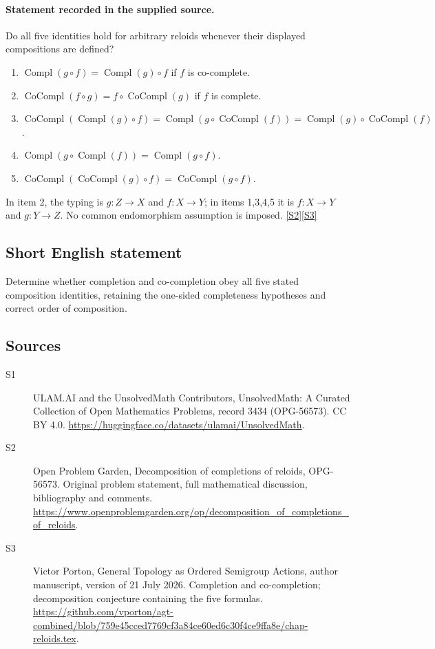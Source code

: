 \documentclass[11pt]{article}
\newcommand{\sref}[2]{\hyperlink{source:#1:#2}{[S#2]}}
\begin{document}
\paragraph{Statement recorded in the supplied source.}
Do all five identities hold for arbitrary reloids whenever their displayed compositions are defined?
\begin{enumerate}
\item $\operatorname{Compl}(g\circ f)=\operatorname{Compl}(g)\circ f$ if $f$ is co-complete.
\item $\operatorname{CoCompl}(f\circ g)=f\circ\operatorname{CoCompl}(g)$ if $f$ is complete.
\item $\operatorname{CoCompl}(\operatorname{Compl}(g)\circ f)=\operatorname{Compl}(g\circ\operatorname{CoCompl}(f))=\operatorname{Compl}(g)\circ\operatorname{CoCompl}(f)$.
\item $\operatorname{Compl}(g\circ\operatorname{Compl}(f))=\operatorname{Compl}(g\circ f)$.
\item $\operatorname{CoCompl}(\operatorname{CoCompl}(g)\circ f)=\operatorname{CoCompl}(g\circ f)$.
\end{enumerate}
In item 2, the typing is $g:Z\to X$ and $f:X\to Y$; in items 1,3,4,5 it is $f:X\to Y$ and $g:Y\to Z$. No common endomorphism assumption is imposed. \sref{3434}{2}\sref{3434}{3}
\subsection{Short English statement}
Determine whether completion and co-completion obey all five stated composition identities, retaining the one-sided completeness hypotheses and correct order of composition.
\subsection{Sources}
\begin{description}
\item[\hypertarget{source:3434:1}{S1}] ULAM.AI and the UnsolvedMath Contributors, UnsolvedMath: A Curated Collection of Open Mathematics Problems, record 3434 (OPG-56573). CC BY 4.0. \url{https://huggingface.co/datasets/ulamai/UnsolvedMath}.
\item[\hypertarget{source:3434:2}{S2}] Open Problem Garden, Decomposition of completions of reloids, OPG-56573. Original problem statement, full mathematical discussion, bibliography and comments. \url{https://www.openproblemgarden.org/op/decomposition_of_completions_of_reloids}.
\item[\hypertarget{source:3434:3}{S3}] Victor Porton, General Topology as Ordered Semigroup Actions, author manuscript, version of 21 July 2026. Completion and co-completion; decomposition conjecture containing the five formulas. \url{https://github.com/vporton/agt-combined/blob/759e45cced7769cf3a84ce60ed6c30f4ce9ffa8e/chap-reloids.tex}.
\end{description}
\label{end:3434}
\end{document}
